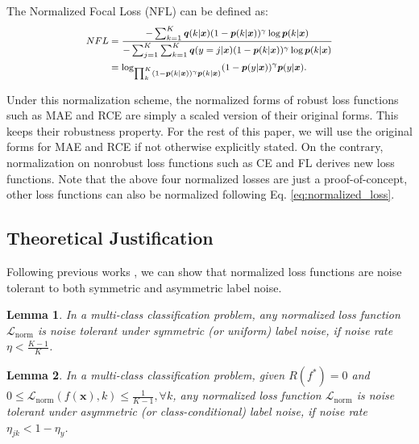 \documentclass{article}
\newtheorem{lemma}{Lemma}
\def \xx {{\bm{x}}}
\def \pp {{\bm{p}}}
\def \qq {{\bm{q}}}
\def \L  {\mathcal{L}}
\begin{document}
The Normalized Focal Loss (NFL) can be defined as:
\begin{equation}\label{eq:nfl}
\footnotesize
\begin{split}
    NFL &= \frac{-\sum_{k=1}^{K} \qq(k|\xx) (1 - \pp(k|\xx))^{\gamma} \log \pp(k|\xx)}{-\sum_{j=1}^{K}\sum_{k=1}^{K} \qq(y=j|\xx) (1 - \pp(k|\xx))^{\gamma} \log \pp(k|\xx)} \\
    &= \log_{\prod_{k}^{K} (1 - \pp(k|\xx))^{\gamma}\pp(k|\xx)}(1 - \pp(y|\xx))^{\gamma}\pp(y|\xx).
\end{split}
\end{equation}

Under this normalization scheme, the normalized forms of robust loss functions such as MAE and RCE are simply a scaled version of their original forms. This keeps their robustness property. For the rest of this paper, we will use the original forms for MAE and RCE if not otherwise explicitly stated. On the contrary, normalization on nonrobust loss functions such as CE and FL derives new loss functions.
Note that the above four normalized losses are just a proof-of-concept, other loss functions can also be normalized following Eq. \eqref{eq:normalized_loss}. 

\subsection{Theoretical Justification}
Following previous works \cite{ghosh2017robust,wang2019symmetric}, we can show that normalized loss functions are noise tolerant to both symmetric and asymmetric label noise.

\begin{lemma}\label{lemma_1}
In a multi-class classification problem, any normalized loss function $\L_{\text{norm}}$ is noise tolerant under symmetric (or uniform) label noise, if noise rate $\eta < \frac{K-1}{K}$.
\end{lemma}


\begin{lemma}\label{lemma_2}
In a multi-class classification problem, given $R(f^{*})=0$ and $0 \leq \L_{\text{norm}}(f(\xx), k) \leq \frac{1}{K-1}, \forall k$, any normalized loss function $\L_{\text{norm}}$ is noise tolerant under asymmetric (or class-conditional) label noise, if noise rate $\eta_{jk} < 1- \eta_y$.
\end{lemma}
\end{document}
